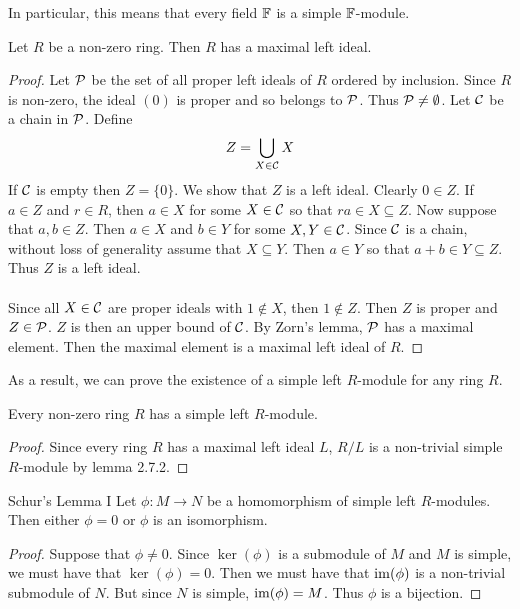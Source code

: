 \documentclass[a4paper]{article}
\begin{document}
In particular, this means that every field $\mathbb{F}$ is a simple $\mathbb{F}$-module. 

\begin{thm}{}{} Let $R$ be a non-zero ring. Then $R$ has a maximal left ideal. \tcbline
\begin{proof}
Let $\mathcal{P}$ be the set of all proper left ideals of $R$ ordered by inclusion. Since $R$ is non-zero, the ideal $(0)$ is proper and so belongs to $\mathcal{P}$. Thus $\mathcal{P}\neq\emptyset$. Let $\mathcal{C}$ be a chain in $\mathcal{P}$. Define $$Z=\bigcup_{X\in\mathcal{C}}X$$ If $\mathcal{C}$ is empty then $Z=\{0\}$. We show that $Z$ is a left ideal. Clearly $0\in Z$. If $a\in Z$ and $r\in R$, then $a\in X$ for some $X\in\mathcal{C}$ so that $ra\in X\subseteq Z$. Now suppose that $a,b\in Z$. Then $a\in X$ and $b\in Y$ for some $X,Y\in\mathcal{C}$. Since $\mathcal{C}$ is a chain, without loss of generality assume that $X\subseteq Y$. Then $a\in Y$ so that $a+b\in Y\subseteq Z$. Thus $Z$ is a left ideal. \\~\\

Since all $X\in\mathcal{C}$ are proper ideals with $1\notin X$, then $1\notin Z$. Then $Z$ is proper and $Z\in\mathcal{P}$. $Z$ is then an upper bound of $\mathcal{C}$. By Zorn's lemma, $\mathcal{P}$ has a maximal element. Then the maximal element is a maximal left ideal of $R$. 
\end{proof}
\end{thm}

As a result, we can prove the existence of a simple left $R$-module for any ring $R$. 

\begin{crl}{}{} Every non-zero ring $R$ has a simple left $R$-module. \tcbline
\begin{proof}
Since every ring $R$ has a maximal left ideal $L$, $R/L$ is a non-trivial simple $R$-module by lemma 2.7.2. 
\end{proof}
\end{crl}

\begin{prp}{Schur's Lemma I}{} Let $\phi:M\to N$ be a homomorphism of simple left $R$-modules. Then either $\phi=0$ or $\phi$ is an isomorphism. \tcbline
\begin{proof}
Suppose that $\phi\neq 0$. Since $\ker(\phi)$ is a submodule of $M$ and $M$ is simple, we must have that $\ker(\phi)=0$. Then we must have that $\operatorname{im}(\phi)$ is a non-trivial submodule of $N$. But since $N$ is simple, $\operatorname{im}(\phi)=M$. Thus $\phi$ is a bijection. 
\end{proof}
\end{prp}
\end{document}
